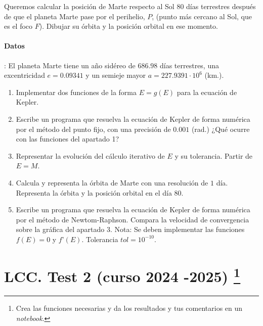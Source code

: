 Queremos calcular la posición de Marte respecto al Sol 80 días terrestres después de que el planeta Marte pase por el perihelio, $P$, (punto más cercano al Sol, que es el foco $F$). Dibujar su órbita y la posición orbital en ese momento.
\paragraph{Datos}: El planeta Marte tiene un año sidéreo de $686.98$ días terrestres, una excentricidad $e=0.09341$ y un semieje mayor $a= 227.9391 \cdot 10^6 $ (km.).

\begin{enumerate}
    \item Implementar  dos funciones de la forma $E=g(E)$ para la ecuación de Kepler.
    \item Escribe un programa que resuelva la ecuación de Kepler de forma numérica por el método del punto fijo, con una precisión de $0.001$ (rad.) ¿Qué ocurre con las funciones del apartado 1?
    \item Representar la evolución del cálculo iterativo de $E$ y su tolerancia. Partir de $E=M$.
    \item Calcula y representa la órbita de Marte con una resolución de $1$ día. Representa la órbita y la posición orbital en el día $80$.
    \item Escribe un programa  que resuelva la ecuación de Kepler de forma numérica por el método de Newtom-Raphson. Compara la velocidad de convergencia sobre la gráfica del apartado 3. Nota: Se deben implementar las funciones $f(E)=0$ y $f ’(E)$. Tolerancia $tol=10^{-10}$.
\end{enumerate}

\section{LCC. Test 2 (curso 2024 -2025) \protect\footnote{Crea las funciones necesarias  y da los resultados y tus comentarios en un \emph{notebook}.}}

